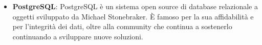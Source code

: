 \begin{itemize}
    \item \textbf{PostgreSQL}: PostgreSQL è un sistema open source di database relazionale 
    a oggetti sviluppato da Michael Stonebraker. È famoso per la sua affidabilità e per 
    l'integrità dei dati, oltre alla community che continua a sostenerlo continuando
    a sviluppare nuove soluzioni.
    \cite{PostgreSQL}
    

\end{itemize}